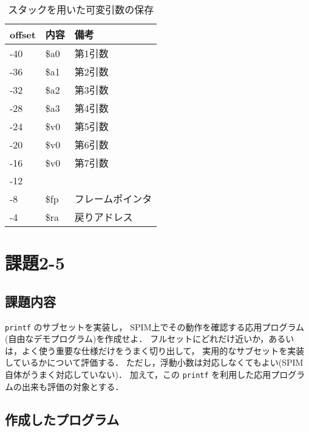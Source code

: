 \documentclass[a4j,11pt]{jarticle}
\begin{document}
\begin{table}[]
      \centering
      \caption{スタックを用いた可変引数の保存}
      \label{tbl:2-4}
      \begin{tabular}{|l|l|l|}
      \hline
      offset & 内容   & 備考   \\ \hline
      -40    & \$a0 & 第1引数 \\ \hline
      -36    & \$a1 & 第2引数 \\ \hline
      -32    & \$a2 & 第3引数 \\ \hline
      -28    & \$a3 & 第4引数 \\ \hline
      -24    & \$v0 & 第5引数 \\ \hline
      -20    & \$v0 & 第6引数 \\ \hline
      -16    & \$v0 & 第7引数 \\ \hline
      -12    &      &      \\ \hline
      -8     & \$fp & フレームポインタ \\ \hline
      -4     & \$ra & 戻りアドレス \\ \hline
      \end{tabular}
      \end{table}

\section{課題2-5}

\subsection{課題内容}

{\tt printf} のサブセットを実装し， SPIM上でその動作を確認する応用プログラム(自由なデモプログラム)を作成せよ． 
フルセットにどれだけ近いか，あるいは，よく使う重要な仕様だけをうまく切り出して， 
実用的なサブセットを実装しているかについて評価する． 
ただし，浮動小数は対応しなくてもよい(SPIM自体がうまく対応していない)． 
加えて，この {\tt printf} を利用した応用プログラムの出来も評価の対象とする．


\subsection{作成したプログラム}
\end{document}

